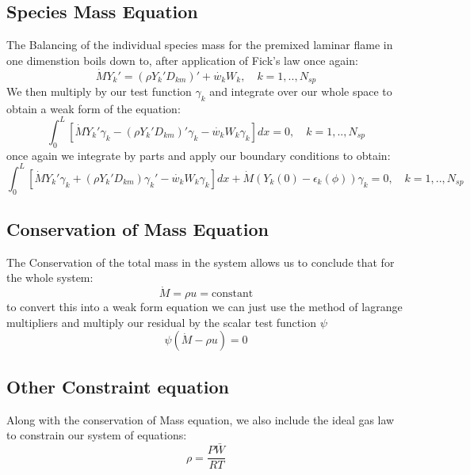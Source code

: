 \documentclass{article}
\begin{document}
    \subsection{Species Mass Equation}
    The Balancing of the individual species mass for the premixed laminar flame in one dimenstion boils down to, after application of Fick's law once again:
    \begin{equation}
      \dot{M}Y_{k}' = (\rho Y_{k}'D_{km})'+\dot{w_{k}}W_{k},\quad k=1,..,N_{sp}
    \end{equation}
    We then multiply by our test function $\gamma_{k}$ and integrate over our whole space to obtain a weak form of the equation:
    \begin{equation}
      \int_{0}^{L}[\dot{M}Y_{k}'\gamma_{k}-(\rho Y_{k}'D_{km})'\gamma_{k}-\dot{w_{k}}W_{k}\gamma_{k}]dx = 0,\quad k=1,..,N_{sp}
    \end{equation}
    once again we integrate by parts and apply our boundary conditions to obtain:
    \begin{equation}
      \int_{0}^{L}[\dot{M}Y_{k}'\gamma_{k}+(\rho Y_{k}'D_{km})\gamma_{k}'-\dot{w_{k}}W_{k}\gamma_{k}]dx + \dot{M}(Y_{k}(0)-\epsilon_{k}(\phi))\gamma_{k} = 0,\quad k=1,..,N_{sp}
      \end{equation}




    \subsection{Conservation of Mass Equation}
    The Conservation of the total mass in the system allows us to conclude that for the whole system:
    \begin{equation}
    \dot{M} = \rho u = \text{constant}
\end{equation}
to convert this into a weak form equation we can just use the method of lagrange multipliers and multiply our residual by the scalar test function $\psi$
\begin{equation}
  \psi(\dot{M}-\rho u) = 0
\end{equation}

\subsection{Other Constraint equation}
Along with the conservation of Mass equation, we also include the ideal gas law to constrain our system of equations:
\begin{equation}
  \rho = \frac{P\bar{W}}{RT}
\end{equation}
\end{document}
